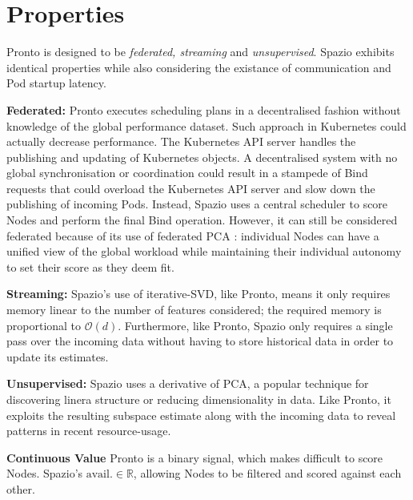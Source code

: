 \section{Properties}
Pronto is designed to be \textit{federated, streaming} and
\textit{unsupervised}. Spazio exhibits identical properties while also
considering the existance of communication and Pod startup latency.

\textbf{Federated:} Pronto executes scheduling plans in a decentralised fashion
without knowledge of the global performance dataset. Such approach in
Kubernetes could actually decrease performance. The Kubernetes API server
handles the publishing and updating of Kubernetes objects. A decentralised
system with no global synchronisation or coordination could result in a
stampede of Bind requests that could overload the Kubernetes API server and slow
down the publishing of incoming Pods. Instead, Spazio uses a central scheduler
to score Nodes and perform the final Bind operation. However, it can still be
considered federated because of its use of federated PCA \cite{}: individual
Nodes can have a unified view of the global workload while maintaining their
individual autonomy to set their score as they deem fit.

\textbf{Streaming:} Spazio's use of iterative-SVD, like Pronto, means it only
requires memory linear to the number of features considered; the required memory
is proportional to $\mathcal{O}(d)$. Furthermore, like Pronto, Spazio only
requires a single pass over the incoming data without having to store historical
data in order to update its estimates.

\textbf{Unsupervised:} Spazio uses a derivative of PCA, a popular technique for
discovering linera structure or reducing dimensionality in data. Like Pronto, it
exploits the resulting subspace estimate along with the incoming data to reveal
patterns in recent resource-usage.

\textbf{Continuous Value} Pronto is a binary signal, which makes difficult to
score Nodes. Spazio's $\text{avail.} \in \mathbb{R}$, allowing Nodes to be
filtered and scored against each other.


